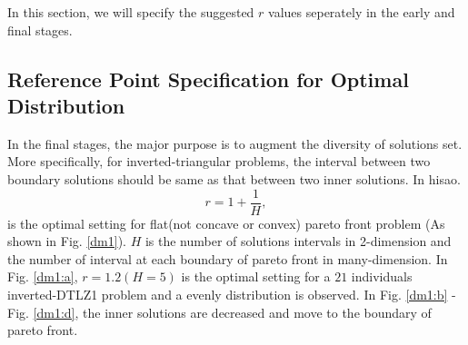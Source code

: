 \documentclass[conference]{IEEEtran}
\begin{document}
In this section, we will specify the suggested $r$ values seperately
in the early and final stages.

%
\subsection{Reference Point Specification for Optimal Distribution}
In the final stages, the major purpose is to augment the diversity of solutions set.
More specifically, for inverted-triangular problems, 
the interval between two boundary solutions should be same as that between two inner solutions.
In hisao\cite{hisao}.%
\begin{equation}\label{eod}
  r=1+\frac{1}{H},
\end{equation}
is the optimal setting for flat(not concave or convex) pareto front problem
(As shown in Fig. \ref{dm1}). $H$ is the number of solutions intervals in 2-dimension 
and the number of interval at each boundary of pareto front in many-dimension.
In Fig. \ref{dm1:a}, $r=1.2(H=5)$ is the optimal setting for a $21$ individuals 
inverted-DTLZ1 problem and a evenly distribution is observed. 
In Fig. \ref{dm1:b} - Fig. \ref{dm1:d}, the inner solutions are decreased and move to
the boundary of pareto front. 
\end{document}
